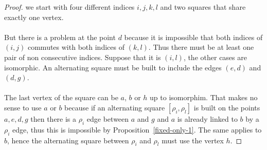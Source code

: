 \begin{proof}
  we start with four different indices $i, j, k, l$ and two squares that share exactly one vertex.

  \begin{figure}[H]
    \begin{center}
      \caption{}
    \end{center}
  \end{figure}

  \paragraph{}
  But there is a problem at the point $d$ because it is impossible that both indices of $(i,j)$ commutes with both indices of $(k,l)$. Thus there must be at least one pair of non consecutive indices. Suppose that it is $(i,l)$, the other cases are isomorphic. An alternating square must be built to include the edges $(e,d)$ and $(d,g)$.

  \paragraph{}
  The last vertex of the square can be $a$, $b$ or $h$ up to isomorphim. That makes no sense to use $a$ or $b$ because if an alternating square $[\rho_i, \rho_l]$ is built on the points $a,e,d,g$ then there is a $\rho_i$ edge between $a$ and $g$ and $a$ is already linked to $b$ by a $\rho_i$ edge, thus this is impossible by Proposition~\ref{fixed-only-1}. The same applies to $b$, hence the alternating square between $\rho_i$ and $\rho_l$ must use the vertex $h$.


\end{proof}
